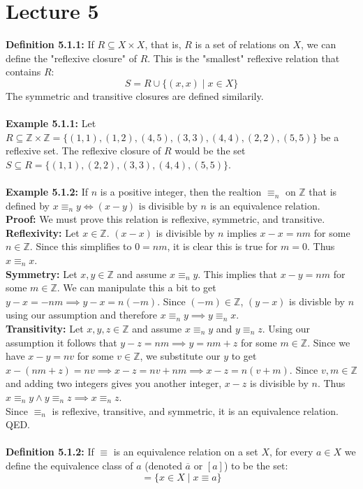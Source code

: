 \documentclass[11pt]{article}
\begin{document}
\section{Lecture 5}
\textbf{Definition 5.1.1:} If $R \subseteq X \times X$, that is, $R$ is a set of relations on $X$, we can define the "reflexive closure" of $R$. This is the "smallest" reflexive relation that contains $R$:
\begin{equation}
    S = R \cup \{(x,x) \;|\; x \in X\}
\end{equation}
The symmetric and transitive closures are defined similarily. \\
\vspace{0.1cm} \\
\textbf{Example 5.1.1:} Let $R \subseteq \mathbb{Z} \times \mathbb{Z} = \{(1,1),(1,2),(4,5),(3,3),(4,4),(2,2),(5,5)\}$ be a reflexive set. The reflexive closure of $R$ would be the set $S \subseteq R = \{(1,1),(2,2),(3,3),(4,4),(5,5)\}$. \\
\vspace{0.1cm} \\
\textbf{Example 5.1.2:} If $n$ is a positive integer, then the realtion $\equiv_{n}$ on $\mathbb{Z}$ that is defined by $x \equiv_{n} y \iff (x-y) \text{ is divisible by } n$ is an equivalence relation. \\
\textbf{Proof:} We must prove this relation is reflexive, symmetric, and transitive. \\
\textbf{Reflexivity:} Let $x \in \mathbb{Z}$. $(x-x)$ is divisible by $n$ implies $x-x=nm$ for some $n \in \mathbb{Z}$. Since this simplifies to $0 = nm$, it is clear this is true for $m = 0$. Thus $x \equiv_{n} x$. \\
\textbf{Symmetry:} Let $x, y \in \mathbb{Z}$ and assume $x \equiv_{n} y$. This implies that $x - y = nm$ for some $m \in \mathbb{Z}$. We can manipulate this a bit to get $y - x = -nm \implies y - x = n(-m)$. Since $(-m) \in \mathbb{Z}$, $(y-x)$ is divisble by $n$ using our assumption and therefore $x \equiv_{n} y \implies y \equiv_{n} x$. \\
\textbf{Transitivity:} Let $x, y, z \in \mathbb{Z}$ and assume $x \equiv_{n} y$ and $y \equiv_{n} z$. Using our assumption it follows that $y-z=nm \implies y = nm+z$ for some $m \in \mathbb{Z}$. Since we have $x-y=nv$ for some $v \in \mathbb{Z}$, we substitute our $y$ to get $x - (nm + z) = nv \implies x - z = nv + nm \implies x - z = n(v + m)$. Since $v,m \in \mathbb{Z}$ and adding two integers gives you another integer, $x-z$ is divisible by $n$. Thus $x \equiv_{n} y \land y \equiv_{n} z \implies x \equiv_{n} z$. \\
Since $\equiv_{n}$ is reflexive, transitive, and symmetric, it is an equivalence relation. QED. \\
\vspace{0.1cm} \\
\textbf{Definition 5.1.2:} If $\equiv$ is an equivalence relation on a set $X$, for every $a \in X$ we define the equivalence class of $a$ (denoted $\overline{a}$ or $[a]$) to be the set:
\begin{equation}
    [a] = \{x \in X \;|\; x \equiv a\}
\end{equation}
\end{document}
